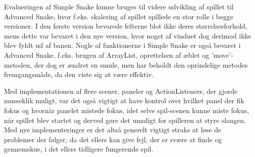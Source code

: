 Evalueringen af Simple Snake kunne bruges til videre udvikling af spillet til Advanced Snake, hvor f.eks. skalering af spillet spillede en stor rolle i begge versioner. I den første version bevarede felterne blot ikke deres størrelsesforhold, mens dette var bevaret i den nye version, hvor noget af vinduet dog derimod ikke blev fyldt ud af banen. Nogle af funktionerne i Simple Snake er også bevaret i Advanced Snake, f.eks. brugen af ArrayList, oprettelsen af æblet og 'move'-metoden, der dog er ændret en smule, men har beholdt den oprindelige metodes fremgangsmåde, da den viste sig at være effektiv.

Med implementationen af flere scener, paneler og ActionListeners, der gjorde musseklik muligt, var det også vigtigt at have kontrol over hvilket panel der fik fokus og hvornår panelet mistede fokus, idet selve spil-scenen kunne miste fokus, når spillet blev startet og derved gøre det umuligt for spilleren at styre slangen. Med nye implementeringer er det altså generelt vigtigt straks at løse de problemer der følger, da det ellers kan give fejl, der er svære at finde og gennemskue, i det ellers tidligere fungerende spil.
